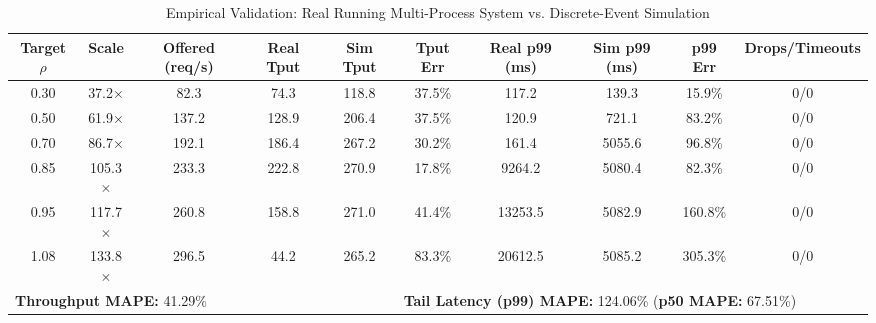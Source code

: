 \begin{table}[t]
\centering
\small
\caption{Empirical Validation: Real Running Multi-Process System vs. Discrete-Event Simulation}
\label{tab:validation}
\begin{tabularx}{\textwidth}{c c c c c c c c c c}
\toprule
\textbf{Target $\rho$} & \textbf{Scale} & \textbf{Offered (req/s)} & \textbf{Real Tput} & \textbf{Sim Tput} & \textbf{Tput Err} & \textbf{Real p99 (ms)} & \textbf{Sim p99 (ms)} & \textbf{p99 Err} & \textbf{Drops/Timeouts} \\
\midrule
0.30 & 37.2$\times$ & 82.3 & 74.3 & 118.8 & 37.5\% & 117.2 & 139.3 & 15.9\% & 0/0 \\
0.50 & 61.9$\times$ & 137.2 & 128.9 & 206.4 & 37.5\% & 120.9 & 721.1 & 83.2\% & 0/0 \\
0.70 & 86.7$\times$ & 192.1 & 186.4 & 267.2 & 30.2\% & 161.4 & 5055.6 & 96.8\% & 0/0 \\
0.85 & 105.3$\times$ & 233.3 & 222.8 & 270.9 & 17.8\% & 9264.2 & 5080.4 & 82.3\% & 0/0 \\
0.95 & 117.7$\times$ & 260.8 & 158.8 & 271.0 & 41.4\% & 13253.5 & 5082.9 & 160.8\% & 0/0 \\
1.08 & 133.8$\times$ & 296.5 & 44.2 & 265.2 & 83.3\% & 20612.5 & 5085.2 & 305.3\% & 0/0 \\
\midrule
\multicolumn{5}{l}{\textbf{Throughput MAPE:} 41.29\%} & \multicolumn{5}{l}{\textbf{Tail Latency (p99) MAPE:} 124.06\% \quad (\textbf{p50 MAPE:} 67.51\%)} \\
\bottomrule
\end{tabularx}
\end{table}
